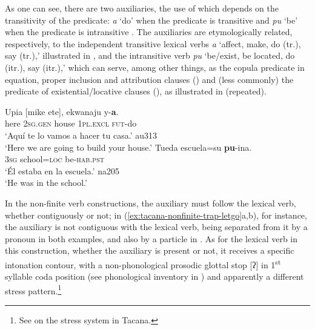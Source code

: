\documentclass[output=paper,draft,draftmode,colorlinks,citecolor=brown]{langscibook}
\begin{document}
As one can see, there are two auxiliaries, the use of which depends on the
transitivity of the predicate: \textit{a} `do' when the predicate is
transitive  and \textit{pu} `be' when the
predicate is intransitive . The auxiliaries
are etymologically related, respectively, to the independent transitive
lexical verbs \textit{a} `affect, make, do (tr.), say (tr.),' illustrated
in , and the intransitive verb
\textit{pu} `be\slash exist, be located, do (itr.), say (itr.),' which can
serve, among other things, as the copula predicate in equation, proper
inclusion and attribution clauses () and (less
commonly) the predicate of existential\slash locative clauses
(), as illustrated in
 (repeated).

\begin{exe}\ex
\label{ex:tacana-auxetymologies-build-school}  
\begin{xlist}
\ex\label{ex:tacana-auxetymologies-build}
\gll Upia  [mike  ete],  ekwanaju  y-\textbf{a}.\\
    here  \textsc{2sg.gen}  house  \textsc{1pl.excl}  \textsc{fut}-do\\
\glt `Aquí te lo vamos a hacer tu casa.' au313\\
`Here we are going to build your house.'
\ex\label{ex:tacana-auxetymologies-school}
 \gll   Tueda  escuela=su  \textbf{pu}{-ina}.\\
    3\textsc{sg}  school=\textsc{loc}  be-\textsc{hab.pst}\\
\glt `Él estaba en la escuela.' na205\\
`He was in the school.'
\end{xlist}\end{exe}


In the non-finite verb constructions, the auxiliary must follow the lexical
verb, whether contiguously or not; in
(\ref{ex:tacana-nonfinite-trap-letgo}a,b), for instance, the auxiliary is
not contiguous with the lexical verb, being separated from it by a pronoun
in both examples, and also by a particle in .
As for the lexical verb in this construction, whether the auxiliary is
present or not, it receives a specific intonation contour, with a
non-phonological prosodic glottal stop [ʔ] in 1\textsuperscript{st}
syllable coda position (see phonological inventory in
) and apparently a different stress
pattern.\footnote{See  on the stress system in Tacana.}
\end{document}
